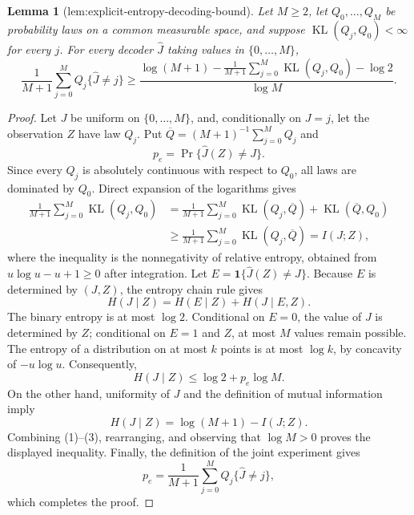 \documentclass{article}
\newtheorem{lemma}{Lemma}
\begin{document}
\begin{lemma}[lem:explicit-entropy-decoding-bound]\label{lem:explicit-entropy-decoding-bound}
Let \(M\ge2\), let \(Q_0,\ldots,Q_M\) be probability laws on a common measurable space, and suppose \(\operatorname{KL}(Q_j,Q_0)<\infty\) for every \(j\). For every decoder \(\widehat J\) taking values in \(\{0,\ldots,M\}\),
\[
 \frac1{M+1}\sum_{j=0}^M Q_j\{\widehat J\ne j\}
 \ge
 \frac{\log(M+1)-\frac1{M+1}\sum_{j=0}^M\operatorname{KL}(Q_j,Q_0)-\log2}{\log M}.
\]
\end{lemma}
\begin{proof}
Let \(J\) be uniform on \(\{0,\ldots,M\}\), and, conditionally on \(J=j\), let the observation \(Z\) have law \(Q_j\). Put \(\overline Q=(M+1)^{-1}\sum_{j=0}^M Q_j\) and
\[
 p_e=\Pr\{\widehat J(Z)\ne J\}.
\]
Since every \(Q_j\) is absolutely continuous with respect to \(Q_0\), all laws are dominated by \(Q_0\). Direct expansion of the logarithms gives
\[
 \begin{aligned}
 \frac1{M+1}\sum_{j=0}^M\operatorname{KL}(Q_j,Q_0)
 &=\frac1{M+1}\sum_{j=0}^M\operatorname{KL}(Q_j,\overline Q)
   +\operatorname{KL}(\overline Q,Q_0)\\
 &\ge \frac1{M+1}\sum_{j=0}^M\operatorname{KL}(Q_j,\overline Q)
 =I(J;Z),
 \end{aligned} \tag{1}
\]
where the inequality is the nonnegativity of relative entropy, obtained from \(u\log u-u+1\ge0\) after integration. Let \(E=\mathbf 1\{\widehat J(Z)\ne J\}\). Because \(E\) is determined by \((J,Z)\), the entropy chain rule gives
\[
 H(J\mid Z)=H(E\mid Z)+H(J\mid E,Z).
\]
The binary entropy is at most \(\log2\). Conditional on \(E=0\), the value of \(J\) is determined by \(Z\); conditional on \(E=1\) and \(Z\), at most \(M\) values remain possible. The entropy of a distribution on at most \(k\) points is at most \(\log k\), by concavity of \(-u\log u\). Consequently,
\[
 H(J\mid Z)\le\log2+p_e\log M. \tag{2}
\]
On the other hand, uniformity of \(J\) and the definition of mutual information imply
\[
 H(J\mid Z)=\log(M+1)-I(J;Z). \tag{3}
\]
Combining (1)--(3), rearranging, and observing that \(\log M>0\) proves the displayed inequality. Finally, the definition of the joint experiment gives
\[
 p_e=\frac1{M+1}\sum_{j=0}^M Q_j\{\widehat J\ne j\},
\]
which completes the proof.
\end{proof}
\end{document}
